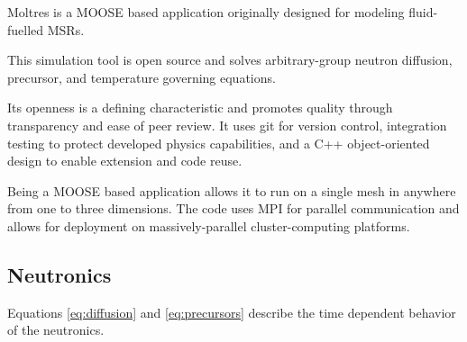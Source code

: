 \documentclass[11pt,letterpaper]{article}
\begin{document}
Moltres \cite{lindsay_introduction_2018} is a \gls{MOOSE} based application originally designed for modeling fluid-fuelled \glspl{MSR}.

This simulation tool is open source and solves arbitrary-group neutron diffusion, precursor, and temperature governing equations.

Its openness is a defining characteristic and promotes quality through transparency and ease of peer review.
It uses git for version control, integration testing to protect developed physics capabilities, and a C++ object-oriented design to enable extension and code reuse.

Being a \gls{MOOSE} based application allows it to run on a single mesh in anywhere from one to three dimensions.
The code uses MPI for parallel communication and allows for deployment on massively-parallel cluster-computing platforms.

\subsection{Neutronics}

Equations \ref{eq:diffusion} and \ref{eq:precursors} describe the time dependent behavior of the neutronics.
\end{document}
